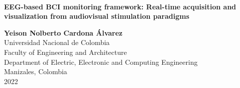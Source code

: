 
\begin{center}

    \begin{figure} \centering
        \\[1.8cm]
    \end{figure}
    
    \thispagestyle{empty}
    
    \begin{spacing}{1.9} 
        \textbf{\huge EEG-based BCI monitoring framework: Real-time acquisition and visualization from audiovisual stimulation paradigms}\\[2cm]
    \end{spacing}
    
    \Large
        \textbf{Yeison Nolberto Cardona Álvarez}\\[3cm]
        
    \small 
        Universidad Nacional de Colombia\\
        Faculty of Engineering and Architecture\\ 
        Department of Electric, Electronic and Computing Engineering\\
        Manizales, Colombia\\
        2022\\
    
\end{center}

\newpage{\pagestyle{empty}\cleardoublepage}
\newpage

